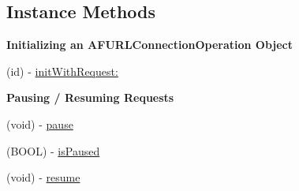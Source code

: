 \subsection*{Instance Methods}
\begin{Indent}{\bf Initializing an A\-F\-U\-R\-L\-Connection\-Operation Object}\par
{\em 

 

 }\begin{DoxyCompactItemize}
\item 
(id) -\/ \hyperlink{interface_a_f_u_r_l_connection_operation_a53e968ee60883356c24cfd0a6c9f47c8}{init\-With\-Request\-:}
\end{DoxyCompactItemize}
\end{Indent}
\begin{Indent}{\bf Pausing / Resuming Requests}\par
{\em 

 

 }\begin{DoxyCompactItemize}
\item 
(void) -\/ \hyperlink{interface_a_f_u_r_l_connection_operation_a7f895d00bdf837f67b959a3bf1bc37a2}{pause}
\item 
(B\-O\-O\-L) -\/ \hyperlink{interface_a_f_u_r_l_connection_operation_a7fbb0a649a549bf21234c02c556c61f9}{is\-Paused}
\item 
(void) -\/ \hyperlink{interface_a_f_u_r_l_connection_operation_ae67c1478ba17af4426ca7152251da473}{resume}
\end{DoxyCompactItemize}
\end{Indent}
